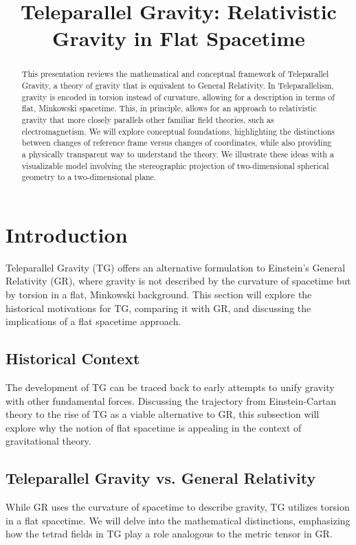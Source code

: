 \documentclass[12pt]{article}
\title{Teleparallel Gravity: Relativistic Gravity in Flat Spacetime}
\author{}
\date{}
\begin{document}
\maketitle

\begin{abstract}
This presentation reviews the mathematical and conceptual framework of Teleparallel Gravity, a theory of gravity that is equivalent to General Relativity. In Teleparallelism, gravity is encoded in torsion instead of curvature, allowing for a description in terms of flat, Minkowski spacetime. This, in principle, allows for an approach to relativistic gravity that more closely parallels other familiar field theories, such as electromagnetism. We will explore conceptual foundations, highlighting the distinctions between changes of reference frame versus changes of coordinates, while also providing a physically transparent way to understand the theory. We illustrate these ideas with a visualizable model involving the stereographic projection of two-dimensional spherical geometry to a two-dimensional plane.
\end{abstract}

\tableofcontents
\newpage

\section{Introduction}
Teleparallel Gravity (TG) offers an alternative formulation to Einstein's General Relativity (GR), where gravity is not described by the curvature of spacetime but by torsion in a flat, Minkowski background. This section will explore the historical motivations for TG, comparing it with GR, and discussing the implications of a flat spacetime approach.

\subsection{Historical Context}
The development of TG can be traced back to early attempts to unify gravity with other fundamental forces. Discussing the trajectory from Einstein-Cartan theory to the rise of TG as a viable alternative to GR, this subsection will explore why the notion of flat spacetime is appealing in the context of gravitational theory.

\subsection{Teleparallel Gravity vs. General Relativity}
While GR uses the curvature of spacetime to describe gravity, TG utilizes torsion in a flat spacetime. We will delve into the mathematical distinctions, emphasizing how the tetrad fields in TG play a role analogous to the metric tensor in GR.
\end{document}

